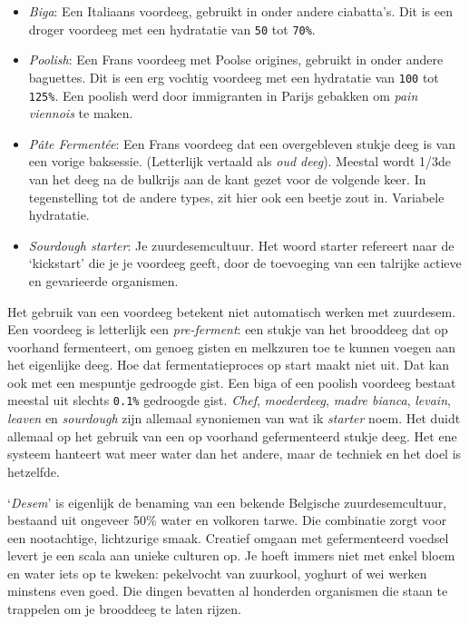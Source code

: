 \documentclass[
  11pt,
  dutch,
]{memoir}
\providecommand{\tightlist}{%
  \setlength{\itemsep}{0pt}\setlength{\parskip}{0pt}}
\begin{document}
\begin{itemize}
\tightlist
\item
  \emph{Biga}: Een Italiaans voordeeg, gebruikt in onder andere
  ciabatta's. Dit is een droger voordeeg met een hydratatie van
  \texttt{50} tot \texttt{70\%}.
\item
  \emph{Poolish}: Een Frans voordeeg met Poolse origines, gebruikt in
  onder andere baguettes. Dit is een erg vochtig voordeeg met een
  hydratatie van \texttt{100} tot \texttt{125\%}. Een poolish werd door
  immigranten in Parijs gebakken om \emph{pain viennois} te maken.
\item
  \emph{Pâte Fermentée}: Een Frans voordeeg dat een overgebleven stukje
  deeg is van een vorige baksessie. (Letterlijk vertaald als \emph{oud
  deeg}). Meestal wordt 1/3de van het deeg na de bulkrijs aan de kant
  gezet voor de volgende keer. In tegenstelling tot de andere types, zit
  hier ook een beetje zout in. Variabele hydratatie.
\item
  \emph{Sourdough starter}: Je zuurdesemcultuur. Het woord starter
  refereert naar de `kickstart' die je je voordeeg geeft, door de
  toevoeging van een talrijke actieve en gevarieerde organismen.
\end{itemize}

Het gebruik van een voordeeg betekent niet automatisch werken met
zuurdesem. Een voordeeg is letterlijk een \emph{pre-ferment}: een stukje
van het brooddeeg dat op voorhand fermenteert, om genoeg gisten en
melkzuren toe te kunnen voegen aan het eigenlijke deeg. Hoe dat
fermentatieproces op start maakt niet uit. Dat kan ook met een mespuntje
gedroogde gist. Een biga of een poolish voordeeg bestaat meestal uit
slechts \texttt{0.1\%} gedroogde gist. \emph{Chef}, \emph{moederdeeg},
\emph{madre bianca}, \emph{levain}, \emph{leaven} en \emph{sourdough}
zijn allemaal synoniemen van wat ik \emph{starter} noem. Het duidt
allemaal op het gebruik van een op voorhand gefermenteerd stukje deeg.
Het ene systeem hanteert wat meer water dan het andere, maar de techniek
en het doel is hetzelfde.

`\emph{Desem}' is eigenlijk de benaming van een bekende Belgische
zuurdesemcultuur, bestaand uit ongeveer 50\% water en volkoren tarwe.
Die combinatie zorgt voor een nootachtige, lichtzurige smaak. Creatief
omgaan met gefermenteerd voedsel levert je een scala aan unieke culturen
op. Je hoeft immers niet met enkel bloem en water iets op te kweken:
pekelvocht van zuurkool, yoghurt of wei werken minstens even goed. Die
dingen bevatten al honderden organismen die staan te trappelen om je
brooddeeg te laten rijzen.
\end{document}
